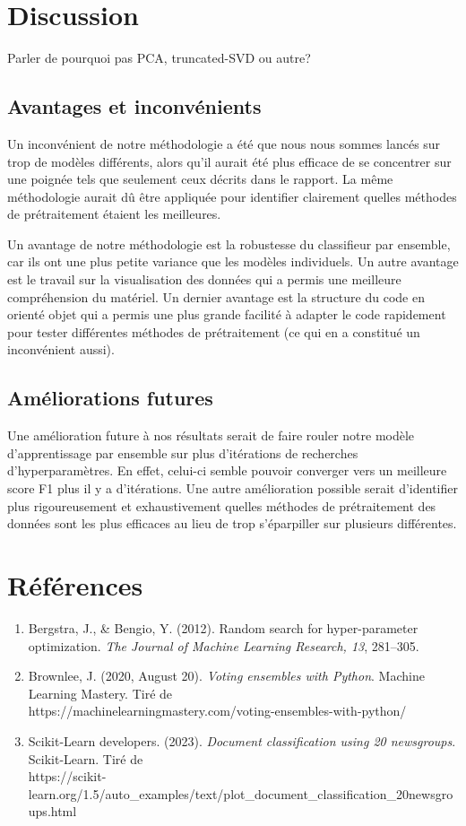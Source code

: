 \documentclass{article}
\begin{document}
\section{Discussion}
Parler de pourquoi pas PCA, truncated-SVD ou autre?
\subsection{Avantages et inconvénients}
Un inconvénient de notre méthodologie a été que nous nous sommes lancés sur trop de modèles différents, alors qu'il aurait été plus efficace de se concentrer sur une poignée tels que seulement ceux décrits dans le rapport. La même méthodologie aurait dû être appliquée pour identifier clairement quelles méthodes de prétraitement étaient les meilleures.

Un avantage de notre méthodologie est la robustesse du classifieur par ensemble, car ils ont une plus petite variance que les modèles individuels. Un autre avantage est le travail sur la visualisation des données qui a permis une meilleure compréhension du matériel. Un dernier avantage est la structure du code en orienté objet qui a permis une plus grande facilité à adapter le code rapidement pour tester différentes méthodes de prétraitement (ce qui en a constitué un inconvénient aussi).

\subsection{Améliorations futures}
Une amélioration future à nos résultats serait de faire rouler notre modèle d'apprentissage par ensemble sur plus d'itérations de recherches d'hyperparamètres. En effet, celui-ci semble pouvoir converger vers un meilleure score F1 plus il y a d'itérations. Une autre amélioration possible serait d'identifier plus rigoureusement et exhaustivement quelles méthodes de prétraitement des données sont les plus efficaces au lieu de trop s'éparpiller sur plusieurs différentes.

\newpage
\section{Références}
\begin{enumerate}
    \item \label{bergstra2012random} Bergstra, J., \& Bengio, Y. (2012). Random search for hyper-parameter optimization. \textit{The Journal of Machine Learning Research, 13}, 281–305.
    \item Brownlee, J. (2020, August 20). \textit{Voting ensembles with Python}. Machine Learning Mastery. Tiré de \\    https://machinelearningmastery.com/voting-ensembles-with-python/
    \item Scikit-Learn developers. (2023). \textit{Document classification using 20 newsgroups}. Scikit-Learn. Tiré de \\ https://scikit-learn.org/1.5/auto\_examples/text/plot\_document\_classification\_20newsgroups.html

\end{enumerate}
\end{document}
